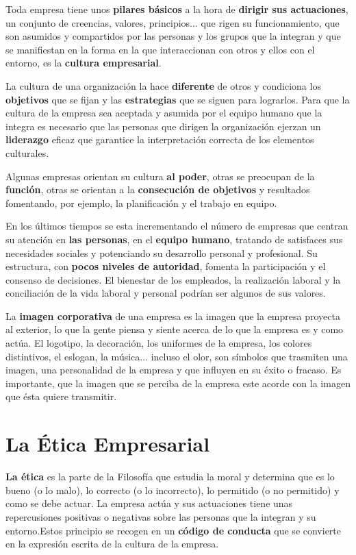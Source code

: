 Toda empresa tiene unos \textbf{pilares básicos} a la hora de \textbf{dirigir sus actuaciones}, un conjunto de creencias, valores, principios... que rigen su funcionamiento, que son asumidos y compartidos por las personas y los grupos que la integran y que se manifiestan en la forma en la que interaccionan con otros y ellos con el entorno, es la \textbf{cultura empresarial}.

La cultura de una organización la hace \textbf{diferente} de otros y condiciona los \textbf{objetivos} que se fijan y las \textbf{estrategias} que se siguen para lograrlos. Para que la cultura de la empresa sea aceptada y asumida por el equipo humano que la integra es necesario que las personas que dirigen la organización ejerzan un \textbf{liderazgo} eficaz que garantice la interpretación correcta de los elementos culturales.

Algunas empresas orientan su cultura \textbf{al poder}, otras se preocupan de la \textbf{función}, otras se orientan a la \textbf{consecución de objetivos} y resultados fomentando, por ejemplo, la planificación y el trabajo en equipo.

En los últimos tiempos se esta incrementando el número de empresas que centran su atención en \textbf{las personas}, en el \textbf{equipo humano}, tratando de satisfaces sus necesidades sociales y potenciando su desarrollo personal y profesional. Su estructura, con \textbf{pocos niveles de autoridad}, fomenta la participación y el consenso de decisiones. El bienestar de los empleados, la realización laboral y la conciliación de la vida laboral y personal podrían ser algunos de sus valores.

La \textbf{imagen corporativa} de una empresa es la imagen que la empresa proyecta al exterior, lo que la gente piensa y siente acerca de lo que la empresa es y como actúa. El logotipo, la decoración, los uniformes de la empresa, los colores distintivos, el eslogan, la música... incluso el olor, son símbolos que trasmiten una imagen, una personalidad de la empresa y que influyen en su éxito o fracaso. Es importante, que la imagen que se perciba de la empresa este acorde con la imagen que ésta quiere transmitir.

\section{La Ética Empresarial}
\textbf{La ética} es la parte de la Filosofía que estudia la moral y determina que es lo bueno (o lo malo), lo correcto (o lo incorrecto), lo permitido (o no permitido) y como se debe actuar. La empresa actúa y sus actuaciones tiene unas repercusiones positivas o negativas sobre las personas que la integran y su entorno.Estos principio se recogen en un \textbf{código de conducta} que se convierte en la expresión escrita de la cultura de la empresa.

